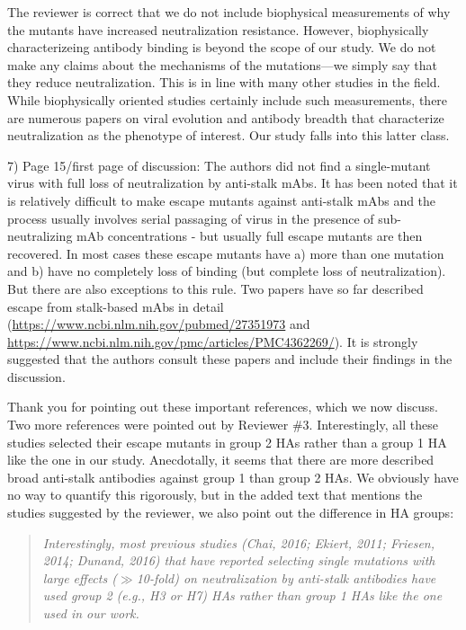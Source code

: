 \documentclass[11pt, oneside]{article}   	%
\begin{document}
{\color{black}
The reviewer is correct that we do not include biophysical measurements of why the mutants have increased neutralization resistance.
However, biophysically characterizeing antibody binding is beyond the scope of our study.
We do not make any claims about the mechanisms of the mutations---we simply say that they reduce neutralization.
This is in line with many other studies in the field.
While biophysically oriented studies certainly include such measurements, there are numerous papers on viral evolution and antibody breadth that characterize neutralization as the phenotype of interest.
Our study falls into this latter class.
}

7) Page 15/first page of discussion: The authors did not find a single-mutant virus with full loss of neutralization by anti-stalk mAbs. It has been noted that it is relatively difficult to make escape mutants against anti-stalk mAbs and the process usually involves serial passaging of virus in the presence of sub-neutralizing mAb concentrations - but usually full escape mutants are then recovered. In most cases these escape mutants have a) more than one mutation and b) have no completely loss of binding (but complete loss of neutralization). But there are also exceptions to this rule. Two papers have so far described escape from stalk-based mAbs in detail (\url{https://www.ncbi.nlm.nih.gov/pubmed/27351973} and \url{https://www.ncbi.nlm.nih.gov/pmc/articles/PMC4362269/}). It is strongly suggested that the authors consult these papers and include their findings in the discussion.

{\color{black}
Thank you for pointing out these important references, which we now discuss.
Two more references were pointed out by Reviewer \#3.
Interestingly, all these studies selected their escape mutants in group 2 HAs rather than a group 1 HA like the one in our study.
Anecdotally, it seems that there are more described broad anti-stalk antibodies against group 1 than group 2 HAs.
We obviously have no way to quantify this rigorously, but in the added text that mentions the studies suggested by the reviewer, we also point out the difference in HA groups:

\begin{quote}
\textsl{Interestingly, most previous studies (Chai, 2016; Ekiert, 2011; Friesen, 2014; Dunand, 2016) that have reported selecting single mutations with large effects ($\gg$10-fold) on neutralization by anti-stalk antibodies have used group 2 (e.g., H3 or H7) HAs rather than group 1 HAs like the one used in our work.}
\end{quote}
}
\end{document}
